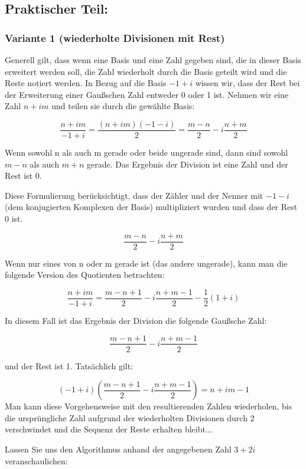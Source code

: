 \documentclass[course=erap]{aspdoc}
\begin{document}
\newpage
\subsection{Praktischer Teil:}
\subsubsection{Variante 1 (wiederholte Divisionen mit Rest)}
Generell gilt, dass wenn eine Basis und eine Zahl gegeben sind, die in dieser Basis erweitert werden soll, die Zahl wiederholt durch die Basis geteilt wird und die Reste notiert werden. In Bezug auf die Basis $-1+i$ wissen wir, dass der Rest bei der Erweiterung einer Gaußschen Zahl entweder 0 oder 1 ist.
\newline
Nehmen wir eine Zahl $n + im$ und teilen sie durch die gewählte Basis:

\[\frac{{n + im}}{{-1 + i}} = \frac{{(n + im)(-1 - i)}}{2} = \frac{{m - n}}{2} - i\frac{{n + m}}{2}\]

Wenn sowohl n als auch m gerade oder beide ungerade sind, dann sind sowohl $m-n$ als auch $m+n$ gerade. Das Ergebnis der Division ist eine Zahl und der Rest ist 0.

Diese Formulierung berücksichtigt, dass der Zähler und der Nenner mit $-1-i$  (dem konjugierten Komplexen der Basis) multipliziert wurden und dass der Rest 0 ist.

\[\frac{{m - n}}{{2}} - i\frac{{n + m}}{2}\]

Wenn nur eines von n oder m gerade ist (das andere ungerade), kann man die folgende Version des Quotienten betrachten:

\[\frac{{n + im}}{{-1 + i}} = \frac{{m - n + 1}}{2} - i \frac{{n + m -1}}{2} - \frac{{1}}{2}(1 + i)\]

In diesem Fall ist das Ergebnis der Division die folgende Gaußsche Zahl:

\[\frac{{m - n + 1}}{{2}} - i\frac{{n + m - 1}}{2}\]

und der Rest ist 1. Tatsächlich gilt:

\[(-1 +i) (\frac{m - n + 1}{2} - i \frac{n + m - 1}{2}) = n +im - 1\]
Man kann diese Vorgehensweise mit den resultierenden Zahlen wiederholen, bis die ursprüngliche Zahl aufgrund der wiederholten Divisionen durch 2 verschwindet und die Sequenz der Reste erhalten bleibt...
\newline

Lassen Sie uns den Algorithmus anhand der angegebenen Zahl $3 + 2i$ veranschaulichen:
\end{document}
